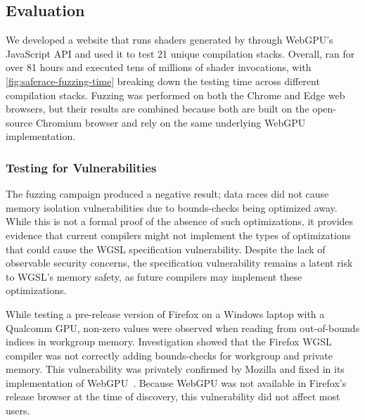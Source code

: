\subsection{Evaluation \label{sec:saferace-assess-td-eval}}

We developed a website that runs shaders generated by \wgslmemsmith through WebGPU's JavaScript API and used it to test 21 unique compilation stacks. Overall, \wgslmemsmith ran for over 81 hours and executed tens of millions of shader invocations, with \myfig\ref{fig:saferace-fuzzing-time} breaking down the testing time across different compilation stacks. Fuzzing was performed on both the Chrome and Edge web browsers, but their results are combined because both are built on the open-source Chromium browser and rely on the same underlying WebGPU implementation.

\subsubsection{Testing for Vulnerabilities\label{sec:saferace-assess-td-eval-vuln}}
The fuzzing campaign produced a negative result; data races did not cause memory isolation vulnerabilities due to bounds-checks being optimized away. While this is not a formal proof of the absence of such optimizations, it provides evidence that current compilers might not implement the types of optimizations that could cause the WGSL specification vulnerability. Despite the lack of observable security concerns, the specification vulnerability remains a latent risk to WGSL's memory safety, as future compilers may implement these optimizations.

While testing a pre-release version of Firefox on a Windows laptop with a Qualcomm GPU, non-zero values were observed when reading from out-of-bounds indices in workgroup memory. Investigation showed that the Firefox WGSL compiler was not correctly adding bounds-checks for workgroup and private memory. This vulnerability was privately confirmed by Mozilla and fixed in its implementation of WebGPU~\cite{wgpu-oob}. Because WebGPU was not available in Firefox's release browser at the time of discovery, this vulnerability did not affect most users.

